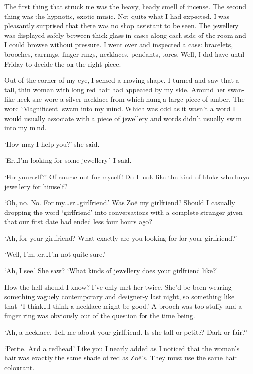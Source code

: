 The first thing that struck me was the heavy, heady smell of
incense. The second thing was the hypnotic, exotic music. Not quite
what I had expected. I was pleasantly surprised that there was no
shop assistant to be seen. The jewellery was displayed safely
between thick glass in cases along each side of the room and I could
browse without pressure. I went over and inspected a case:
bracelets, brooches, earrings, finger rings, necklaces, pendants,
torcs. Well, I did have until Friday to decide the on the right
piece.

Out of the corner of my eye, I sensed a moving shape. I turned and
saw that a tall, thin woman with long red hair had appeared by my
side. Around her swan-like neck she wore a silver necklace from
which hung a large piece of amber. The word `Magnificent' swam into
my mind. Which was odd as it wasn't a word I would usually associate
with a piece of jewellery and words didn't usually swim into my
mind.

`How may I help you?' she said.

`Er\dots I'm looking for some jewellery,' I said.

`For yourself?' Of course not for myself! Do I look like the kind of
bloke who buys jewellery for himself?

`Oh, no. No. For my\dots er\dots girlfriend.' Was Zoë my
girlfriend? Should I casually dropping the word `girlfriend' into
conversations with a complete stranger given that our first date had
ended less four hours ago?

`Ah, for your {\twelveit girlfriend\/}? What exactly are you looking
for for your girlfriend?'

`Well, I'm\dots er\dots I'm not quite sure.'

`Ah, I see.' She saw? `What kinds of jewellery does your girlfriend
like?'

How the hell should I know? I've only met her twice. She'd be been
wearing something vaguely contemporary and designer-y last night, so
something like that. `I think\dots I think a necklace might be
good.' A brooch was too stuffy and a finger ring was obviously out of the
question for the time being.

`Ah, a necklace. Tell me about your girlfriend. Is she tall or
petite? Dark or fair?'

`Petite. And a redhead.' Like you I nearly added as I noticed that
the woman's hair was exactly the same shade of red as Zoë's.
They must use the same hair colourant.

